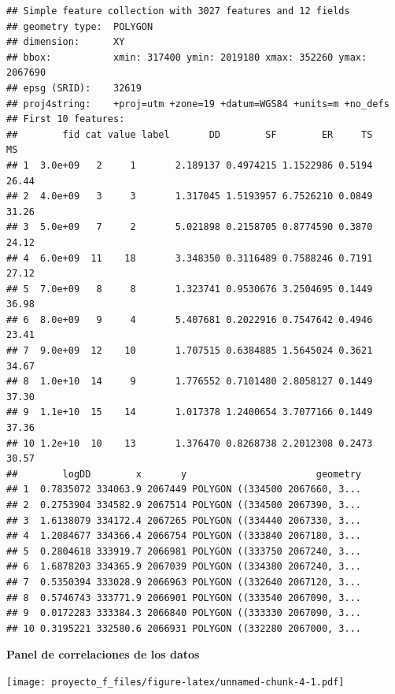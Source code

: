 \documentclass[11pt,]{article}
\begin{document}
\begin{verbatim}
## Simple feature collection with 3027 features and 12 fields
## geometry type:  POLYGON
## dimension:      XY
## bbox:           xmin: 317400 ymin: 2019180 xmax: 352260 ymax: 2067690
## epsg (SRID):    32619
## proj4string:    +proj=utm +zone=19 +datum=WGS84 +units=m +no_defs
## First 10 features:
##        fid cat value label       DD        SF        ER     TS    MS
## 1  3.0e+09   2     1       2.189137 0.4974215 1.1522986 0.5194 26.44
## 2  4.0e+09   3     3       1.317045 1.5193957 6.7526210 0.0849 31.26
## 3  5.0e+09   7     2       5.021898 0.2158705 0.8774590 0.3870 24.12
## 4  6.0e+09  11    18       3.348350 0.3116489 0.7588246 0.7191 27.12
## 5  7.0e+09   8     8       1.323741 0.9530676 3.2504695 0.1449 36.98
## 6  8.0e+09   9     4       5.407681 0.2022916 0.7547642 0.4946 23.41
## 7  9.0e+09  12    10       1.707515 0.6384885 1.5645024 0.3621 34.67
## 8  1.0e+10  14     9       1.776552 0.7101480 2.8058127 0.1449 37.30
## 9  1.1e+10  15    14       1.017378 1.2400654 3.7077166 0.1449 37.36
## 10 1.2e+10  10    13       1.376470 0.8268738 2.2012308 0.2473 30.57
##        logDD        x       y                       geometry
## 1  0.7835072 334063.9 2067449 POLYGON ((334500 2067660, 3...
## 2  0.2753904 334582.9 2067514 POLYGON ((334500 2067390, 3...
## 3  1.6138079 334172.4 2067265 POLYGON ((334440 2067330, 3...
## 4  1.2084677 334366.4 2066754 POLYGON ((333840 2067180, 3...
## 5  0.2804618 333919.7 2066981 POLYGON ((333750 2067240, 3...
## 6  1.6878203 334365.9 2067039 POLYGON ((334380 2067240, 3...
## 7  0.5350394 333028.9 2066963 POLYGON ((332640 2067120, 3...
## 8  0.5746743 333771.9 2066901 POLYGON ((333540 2067090, 3...
## 9  0.0172283 333384.3 2066840 POLYGON ((333330 2067090, 3...
## 10 0.3195221 332580.6 2066931 POLYGON ((332280 2067000, 3...
\end{verbatim}

\textbf{Panel de correlaciones de los datos}

\texttt{[image: proyecto\_f\_files/figure-latex/unnamed-chunk-4-1.pdf]}
\end{document}
